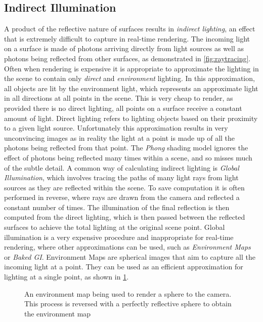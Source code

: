 \documentclass[ %
                    author={Gavin Parker},
                supervisor={Dr. Neill Campbell},
                    degree={MEng},
                     title={Deep Learning for Illumination Estimation from Stereo Images},
                  subtitle={},
                      type={Research},
                      year={2018} ]{dissertation}
\begin{document}
\subsection{Indirect Illumination}
A product of the reflective nature of surfaces results in \textit{indirect lighting}, an effect that is extremely difficult to capture in real-time rendering. The incoming light on a surface is made of photons arriving directly from light sources as well as photons being reflected from other surfaces, as demonstrated in \ref{fig:raytracing}. Often when rendering is expensive it is appropriate to approximate the lighting in the scene to contain only \textit{direct} and \textit{environment} lighting. In this approximation, all objects are lit by the environment light, which represents an approximate light in all directions at all points in the scene. This is very cheap to render, as provided there is no direct lighting, all points on a surface receive a constant amount of light. Direct lighting refers to lighting objects based on their proximity to a given light source. Unfortunately this approximation results in very unconvincing images as in reality the light at a point is made up of all the photons being reflected from that point. The \textit{Phong} shading model ignores the effect of photons being reflected many times within a scene, and so misses much of the subtle detail. A common way of calculating indirect lighting is \textit{Global Illumination}, which involves tracing the paths of many light rays from light sources as they are reflected within the scene. To save computation it is often performed in reverse, where rays are drawn from the camera and reflected a constant number of times. The illumination of the final reflection is then computed from the direct lighting, which is then passed between the reflected surfaces to achieve the total lighting at the original scene point. Global illumination is a very expensive procedure and inappropriate for real-time rendering, where other approximations can be used, such as \textit{Environment Maps} or \textit{Baked GI}. Environment Maps are spherical images that aim to capture all the incoming light at a point. They can be used as an efficient approximation for lighting at a single point, as shown in \ref{fig:envmap}.
\begin{center}
\begin{figure}[H]
\centering
{}
\caption{An environment map being used to render a sphere to the camera. This process is reversed with a perfectly reflective sphere to obtain the environment map}
\label{fig:envmap}

\end{figure}
\end{center}
\end{document}
